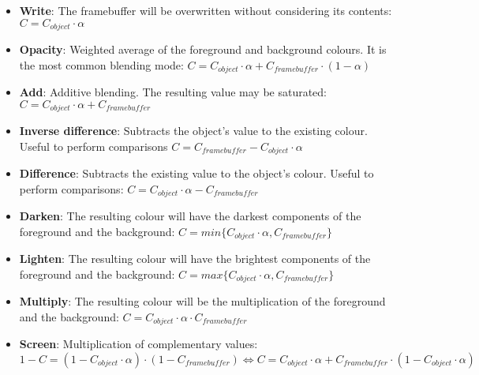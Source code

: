 \documentclass[../main.tex]{subfiles}
\begin{document}
\begin{itemize}
    \item \textbf{Write}: The framebuffer will be overwritten without considering its contents: $C = C_{object} \cdot \alpha$
    
    \item \textbf{Opacity}: Weighted average of the foreground and background colours. It is the most common blending mode: $C = C_{object} \cdot \alpha + C_{framebuffer} \cdot (1 - \alpha)$
    
    \item \textbf{Add}: Additive blending. The resulting value may be saturated: $C = C_{object} \cdot \alpha + C_{framebuffer}$
    
    \item \textbf{Inverse difference}: Subtracts the object's value to the existing colour. Useful to perform comparisons $C = C_{framebuffer} - C_{object} \cdot \alpha$
    
    \item \textbf{Difference}: Subtracts the existing value to the object's colour. Useful to perform comparisons: $C = C_{object} \cdot \alpha - C_{framebuffer}$
    
    \item \textbf{Darken}: The resulting colour will have the darkest components of the foreground and the background: $C = min\{C_{object} \cdot \alpha, C_{framebuffer}\}$
    
    \item \textbf{Lighten}: The resulting colour will have the brightest components of the foreground and the background: $C = max\{C_{object} \cdot \alpha, C_{framebuffer}\}$

    \item \textbf{Multiply}: The resulting colour will be the multiplication of the foreground and the background: $C = C_{object} \cdot \alpha \cdot C_{framebuffer}$
    
    \item \textbf{Screen}: Multiplication of complementary values: $1 - C = (1 - C_{object} \cdot \alpha) \cdot (1 - C_{framebuffer}) \Leftrightarrow C = C_{object} \cdot \alpha + C_{framebuffer} \cdot (1 - C_{object} \cdot \alpha)$
\end{itemize}
\end{document}
